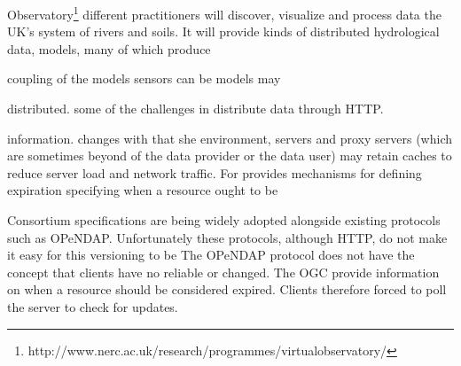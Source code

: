 \documentclass[times]{cpeauth}
\begin{document}


Observatory\footnote{http://www.nerc.ac.uk/research/programmes/virtualobservatory/}
different practitioners will discover, visualize and process data %
the UK's system of rivers and soils.  It will provide %
kinds of distributed hydrological data, %
models, many of which produce %



coupling of the models %
sensors can be %
models may %




distributed.  %
some of the challenges in %
distribute data through HTTP.


information.  %
changes with %
that she %
environment, servers and proxy servers (which are sometimes beyond %
of the data provider or the data user) may retain caches %
to reduce server load and network traffic.  For %
provides mechanisms for defining expiration %
specifying when a resource ought to be %

Consortium specifications are being widely adopted alongside existing %
protocols such as OPeNDAP.  Unfortunately these protocols, although %
HTTP, do not make it easy for this versioning to be %
The OPeNDAP protocol does not have the concept %
that clients have no reliable or %
changed.  The OGC %
provide %
information on when a resource should be considered expired.  Clients %
therefore forced to poll the server to check for updates.
\end{document}
